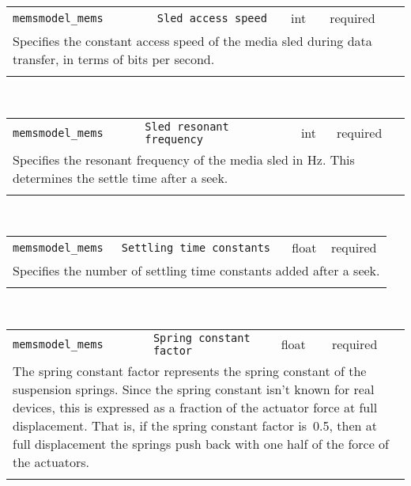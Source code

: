 \noindent 
\begin{tabular}{|p{\lpmodwidth}|p{\lpnamewidth}|p{0.5in}|p{0.5in}|}
\cline{1-4}
\texttt{memsmodel\_mems} & \texttt{Sled access speed} & int & required \\ 
\cline{1-4}
\multicolumn{4}{|p{6in}|}{
Specifies the constant access speed of the media sled during data
transfer, in terms of bits per second.
}\\ 
\cline{1-4}
\multicolumn{4}{p{5in}}{}\\
\end{tabular}\\ 
\noindent 
\begin{tabular}{|p{\lpmodwidth}|p{\lpnamewidth}|p{0.5in}|p{0.5in}|}
\cline{1-4}
\texttt{memsmodel\_mems} & \texttt{Sled resonant frequency} & int & required \\ 
\cline{1-4}
\multicolumn{4}{|p{6in}|}{
Specifies the resonant frequency of the media sled in Hz. This
determines the settle time after a seek.
}\\ 
\cline{1-4}
\multicolumn{4}{p{5in}}{}\\
\end{tabular}\\ 
\noindent 
\begin{tabular}{|p{\lpmodwidth}|p{\lpnamewidth}|p{0.5in}|p{0.5in}|}
\cline{1-4}
\texttt{memsmodel\_mems} & \texttt{Settling time constants} & float & required \\ 
\cline{1-4}
\multicolumn{4}{|p{6in}|}{
Specifies the number of settling time constants added after a seek.
}\\ 
\cline{1-4}
\multicolumn{4}{p{5in}}{}\\
\end{tabular}\\ 
\noindent 
\begin{tabular}{|p{\lpmodwidth}|p{\lpnamewidth}|p{0.5in}|p{0.5in}|}
\cline{1-4}
\texttt{memsmodel\_mems} & \texttt{Spring constant factor} & float & required \\ 
\cline{1-4}
\multicolumn{4}{|p{6in}|}{
The spring constant factor represents the spring constant of the
suspension springs. Since the spring constant isn't known for real
devices, this is expressed as a fraction of the actuator force at full
displacement. That is, if the spring constant factor is~0.5, then at
full displacement the springs push back with one half of the force of
the actuators.
}\\ 
\cline{1-4}
\multicolumn{4}{p{5in}}{}\\
\end{tabular}\\ 
